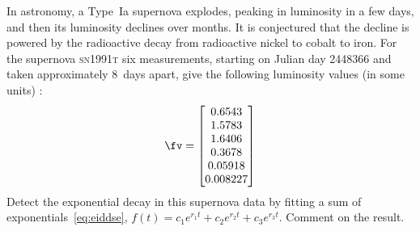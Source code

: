 \begin{exercise}  
In astronomy, a Type~Ia supernova explodes, peaking in luminosity in a few days, and then its luminosity declines over months. 
It is conjectured that the decline is powered by the radioactive decay from radioactive nickel to cobalt to iron.
For the supernova \textsc{sn1991t} six measurements, starting on Julian day 2448366 and taken approximately 8~days apart, give the following luminosity values (in some units) \cite[p.146]{Pereyra2010}:
\setbox\ajrqrbox\hbox{}\marginajrbox%
\begin{equation*}
\fv=\begin{bmatrix} 0.6543
\\ 1.5783
\\ 1.6406
\\ 0.3678
\\ 0.05918
\\ 0.008227 \end{bmatrix}
\end{equation*}
Detect the exponential decay in this supernova data by fitting a sum of exponentials~\eqref{eq:eiddse}, \(f(t)=c_1e^{r_1t}+c_2e^{r_2t}+c_3e^{r_3t}\).
Comment on the result.
\end{exercise}




